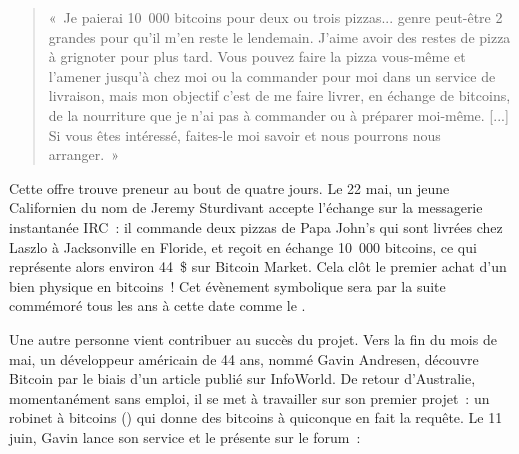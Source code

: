\begin{quote}
«~Je paierai 10~000 bitcoins pour deux ou trois pizzas... genre peut-être 2 grandes pour qu'il m'en reste le lendemain. J'aime avoir des restes de pizza à grignoter pour plus tard. Vous pouvez faire la pizza vous-même et l'amener jusqu'à chez moi ou la commander pour moi dans un service de livraison, mais mon objectif c'est de me faire livrer, en échange de bitcoins, de la nourriture que je n'ai pas à commander ou à préparer moi-même. [...] Si vous êtes intéressé, faites-le moi savoir et nous pourrons nous arranger.~»
\end{quote}

Cette offre trouve preneur au bout de quatre jours. Le 22 mai, un jeune Californien du nom de Jeremy Sturdivant accepte l'échange sur la messagerie instantanée IRC~: il commande deux pizzas de Papa John's qui sont livrées chez Laszlo à Jacksonville en Floride, et reçoit en échange 10~000 bitcoins, ce qui représente alors environ 44~\$ sur Bitcoin Market. Cela clôt le premier achat d'un bien physique en bitcoins~! Cet évènement symbolique sera par la suite commémoré tous les ans à cette date comme le . %


Une autre personne vient contribuer au succès du projet. Vers la fin du mois de mai, un développeur américain de 44 ans, nommé Gavin Andresen, découvre Bitcoin par le biais d'un article publié sur InfoWorld. De retour d'Australie, momentanément sans emploi, il se met à travailler sur son premier projet~: un robinet à bitcoins () qui donne des bitcoins à quiconque en fait la requête. Le 11 juin, Gavin lance son service et le présente sur le forum~:

